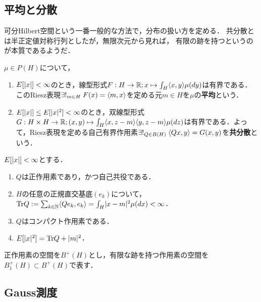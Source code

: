 \documentclass[uplatex,dvipdfmx]{jsreport}
\begin{document}
\subsection{平均と分散}

\begin{tcolorbox}[colframe=ForestGreen, colback=ForestGreen!10!white,breakable,colbacktitle=ForestGreen!40!white,coltitle=black,fonttitle=\bfseries\sffamily,
title=]
    可分Hilbert空間という一番一般的な方法で，分布の扱い方を定める．
    共分散とは半正定値対称行列としたが，無限次元から見れば，
    有限の跡を持つというのが本質であるようだ．
\end{tcolorbox}

\begin{definition}
    $\mu\in P(H)$について，
    \begin{enumerate}
        \item $E[\lvert x\rvert]<\infty$のとき，線型形式$F:H\to\mathbb{R};x\mapsto\int_H\langle x,y\rangle\mu(dy)$は有界である．このRiesz表現$\exists!_{m\in H}\;F(x)=\langle m,x\rangle$を定める元$m\in H$を$\mu$の\textbf{平均}という．
        \item $E[\lvert x\rvert]\le E[\lvert x\rvert^2]<\infty$のとき，双線型形式$G:H\times H\to\mathbb{R};(x,y)\mapsto\int_H\langle x,z-m\rangle\langle y,z-m\rangle\mu(dz)$は有界である．よって，Riesz表現を定める自己有界作用素$\exists!_{Q\in B(H)}\;\langle Qx,y\rangle=G(x,y)$を\textbf{共分散}という．
    \end{enumerate}
\end{definition}

\begin{lemma}[共分散作用素の性質]
    $E[\lvert x\rvert]<\infty$とする．
    \begin{enumerate}
        \item $Q$は正作用素であり，かつ自己共役である．
        \item $H$の任意の正規直交基底$(e_k)$について，$\mathrm{Tr} Q:=\sum_{k\in\mathbb{N}}\langle Qe_k,e_k\rangle=\int_H\lvert x-m\rvert^2\mu(dx)<\infty$．
        \item $Q$はコンパクト作用素である．
        \item $E[\lvert x\rvert^2]=\mathrm{Tr} Q+\lvert m\rvert^2$．
    \end{enumerate}
\end{lemma}

\begin{notation}
    正作用素の空間を$B^+(H)$とし，有限な跡を持つ作用素の空間を$B^+_1(H)\subset B^+(H)$で表す．
\end{notation}

\subsection{Gauss測度}
\end{document}
